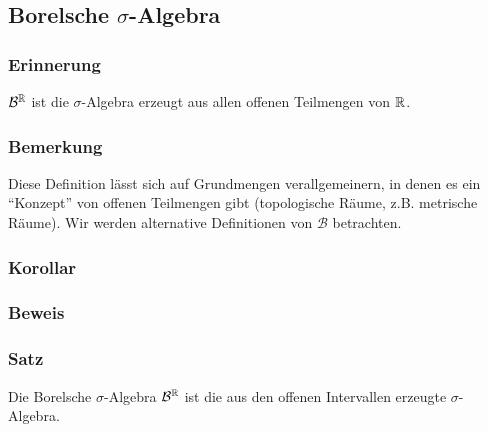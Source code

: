 \subsection{Borelsche $\sigma$-Algebra}
\subsubsection{Erinnerung}
$\mathcal{B}^{\mathbb{R}}$ ist die $\sigma$-Algebra erzeugt aus allen offenen Teilmengen von $\mathbb{R}$.
\subsubsection{Bemerkung}
Diese Definition l\"asst sich auf Grundmengen verallgemeinern, in denen es ein ``Konzept'' von offenen Teilmengen gibt (topologische R\"aume, z.B. metrische R\"aume). Wir werden alternative Definitionen von $\mathcal{B}$ betrachten.
\subsubsection{Korollar}
\subsubsection{Beweis}
\subsubsection{Satz}
Die Borelsche $\sigma$-Algebra $\mathcal{B}^{\mathbb{R}}$ ist die aus den offenen Intervallen erzeugte $\sigma$-Algebra.
